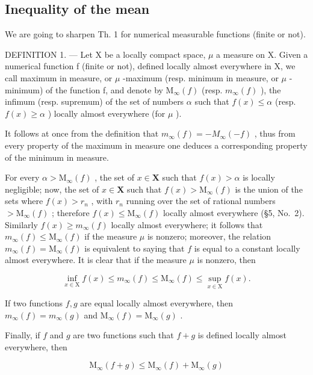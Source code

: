 \subsection{Inequality of the mean}

We are going to sharpen Th. 1 for numerical measurable functions (finite or not).

DEFINITION 1. --- Let X be a locally compact space, \(\mu\) a measure on X. Given a numerical function f (finite or not), defined locally almost everywhere in X, we call maximum in measure, or \(\mu\) -maximum (resp. minimum in measure, or \(\mu\) -minimum) of the function f, and denote by \(\mathrm{M}_{\infty}(f)\) (resp. \(m_{\infty}(f)\) ), the infimum (resp. supremum) of the set of numbers \(\alpha\) such that \(f(x) \leqslant \alpha\) (resp. \(f(x) \geqslant \alpha\) ) locally almost everywhere (for \(\mu\) ).

It follows at once from the definition that \(m_{\infty}(f) = -M_{\infty}(-f)\) , thus from every property of the maximum in measure one deduces a corresponding property of the minimum in measure.

For every \(\alpha > \mathrm{M}_{\infty}(f)\) , the set of \(x \in \mathbf{X}\) such that \(f(x) > \alpha\) is locally negligible; now, the set of \(x \in \mathbf{X}\) such that \(f(x) > \mathrm{M}_{\infty}(f)\) is the union of the sets where \(f(x) > r_n\) , with \(r_n\) running over the set of rational numbers \(> \mathrm{M}_{\infty}(f)\) ; therefore \(f(x) \leqslant \mathrm{M}_{\infty}(f)\) locally almost everywhere (§5, No.~2). Similarly \(f(x) \geqslant m_{\infty}(f)\) locally almost everywhere; it follows that \(m_{\infty}(f) \leqslant \mathrm{M}_{\infty}(f)\) if the measure \(\mu\) is nonzero; moreover, the relation \(m_{\infty}(f) = \mathrm{M}_{\infty}(f)\) is equivalent to saying that \(f\) is equal to a constant locally almost everywhere. It is clear that if the measure \(\mu\) is nonzero, then

\[
\inf _ {x \in \mathrm{X}} f (x) \leqslant m _ {\infty} (f) \leqslant \mathrm{M} _ {\infty} (f) \leqslant \sup _ {x \in \mathrm{X}} f (x).
\]

If two functions \(f, g\) are equal locally almost everywhere, then \(m_{\infty}(f) = m_{\infty}(g)\) and \(\mathrm{M}_{\infty}(f) = \mathrm{M}_{\infty}(g)\) .

Finally, if \(f\) and \(g\) are two functions such that \(f + g\) is defined locally almost everywhere, then

\[
\mathrm{M} _ {\infty} (f + g) \leqslant \mathrm{M} _ {\infty} (f) + \mathrm{M} _ {\infty} (g)\tag{1}
\]

